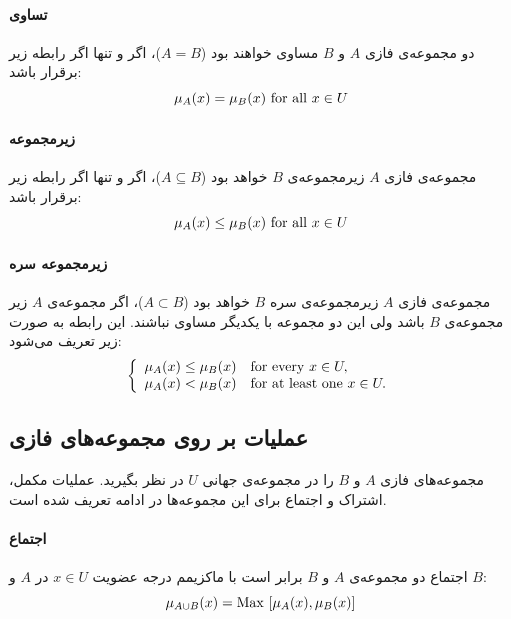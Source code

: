 \paragraph{تساوی}
دو مجموعه‌ی فازی $A$ و $B$ مساوی خواهند بود ($A=B$)، اگر و تنها اگر رابطه زیر برقرار باشد:
\begin{equation}\label{eq:e_fset_rel_eq}
 \mu_{A}(x) = \mu_{B}(x)\  {\rm for\ all}\ x\in U
\end{equation}
\paragraph{زیرمجموعه}
مجموعه‌ی فازی $A$ زیرمجموعه‌ی $B$ خواهد بود ($A \subseteq B$)، اگر و تنها اگر رابطه زیر برقرار باشد:
\begin{equation}\label{eq:e_fset_rel_subseteq}
\mu_{A}(x) \le \mu_{B}(x)\  {\rm for\ all}\ x\in U
\end{equation}
\paragraph{زیرمجموعه سره}
مجموعه‌ی فازی $A$ زیرمجموعه‌ی سره $B$ خواهد بود ($A \subset B$)، اگر مجموعه‌ی $A$ زیر مجموعه‌ی $B$ باشد ولی این دو مجموعه با یکدیگر مساوی نباشند. این رابطه به صورت زیر تعریف می‌شود:
\begin{equation}\label{eq:e_fset_rel_subset}
\left\{ \begin{array}{ll} 
\mu_{A}(x) \le \mu_{B}(x) &    {\rm for\ every}\ x \in U, \\
\mu_{A}(x) < \mu_{B}(x) &  {\rm for\ at\ least\ one}\ x \in U.
\end{array} \right.
\end{equation}
 \subsection{عملیات بر روی مجموعه‌های فازی}
 مجموعه‌های فازی $A$ و $B$ را در مجموعه‌ی جهانی $U$ در نظر بگیرید. عملیات مکمل، اشتراک و اجتماع برای این مجموعه‌ها در ادامه تعریف شده است.
\paragraph{اجتماع}
 اجتماع دو مجموعه‌ی $A$ و $B$ برابر است با ماکزیمم درجه عضویت $x \in U$ در $A$ و $B$:
 \begin{equation}\label{eq:e_fset_op_union}
 \mu_{A \cup B}(x) = {\rm Max}\ [\mu_{A}(x), \mu_{B}(x)]
 \end{equation}
